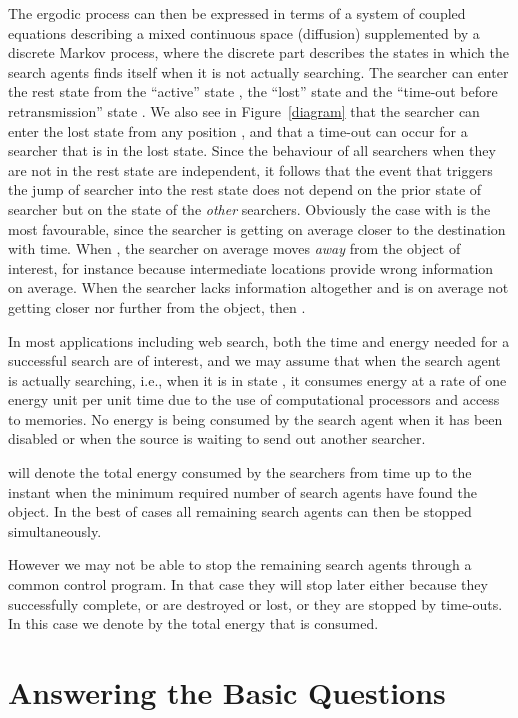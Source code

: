 \documentclass[journal]{IEEEtran}
\begin{document}
The ergodic process  can then be expressed in terms of a system of coupled equations describing a mixed continuous space (diffusion) supplemented by a discrete Markov process, where the discrete part describes the states in which the search agents finds itself when it is not actually searching. The searcher can enter the rest state  from the ``active'' state , the ``lost'' state  and the ``time-out before retransmission'' state . We also see in Figure~\ref{diagram} that the searcher can enter the lost state from any position , and that a time-out can occur for a searcher that is in the lost state. Since the behaviour of all searchers when they are not in the rest state are independent, it follows that the event that triggers the jump of searcher  into the rest state does not depend on the prior state of searcher  but on the state of the {\em other} searchers.
Obviously the case with  is the most favourable, since the searcher is getting on average closer to the destination with time. When  ,  the searcher on average moves {\em away} from the object of interest, for instance because intermediate locations provide wrong information on average. When the searcher lacks information altogether
and is on average not getting closer nor further from the object, then .



In most applications including web search, both the time and energy needed for a successful search are of interest, and we may assume that when the search agent is actually searching, i.e.,
when it is in state , it consumes energy at a rate of one energy unit per unit time
due to the use of computational processors and access to memories.
No energy is being consumed by the  search agent when it has been disabled or when the source is waiting to send out another searcher.

 will denote the total energy consumed by the  searchers from time  up to the instant when
the minimum
required number of  search agents have found the object. In the best of cases all remaining  search agents can then be stopped simultaneously.

However we may not be able to stop the remaining search agents
through a common control program. In that case they will stop later either because they successfully complete, or are destroyed or lost, or they are stopped by time-outs. In this case we denote by   the total energy that is consumed.


\section{Answering the Basic Questions}\label{avg-comput}
\end{document}
